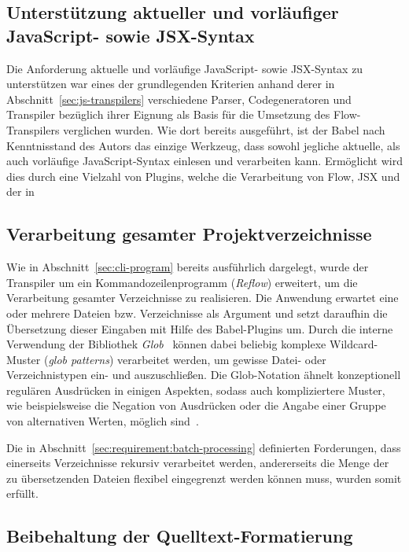 \subsection{Unterstützung aktueller und vorläufiger JavaScript- sowie JSX-Syntax}

Die Anforderung aktuelle und vorläufige JavaScript- sowie JSX-Syntax zu unterstützen war eines der grundlegenden Kriterien anhand derer in Abschnitt~\ref{sec:js-transpilers} verschiedene Parser, Codegeneratoren und Transpiler bezüglich ihrer Eignung als Basis für die Umsetzung des Flow-Transpilers verglichen wurden. Wie dort bereits ausgeführt, ist der Babel nach Kenntnisstand des Autors das einzige Werkzeug, dass sowohl jegliche aktuelle, als auch vorläufige JavaScript-Syntax einlesen und verarbeiten kann. Ermöglicht wird dies durch eine Vielzahl von Plugins, welche die Verarbeitung von Flow, JSX und der in


\subsection{Verarbeitung gesamter Projektverzeichnisse}

Wie in Abschnitt~\ref{sec:cli-program} bereits ausführlich dargelegt, wurde der Transpiler um ein Kommandozeilenprogramm (\textit{Reflow}) erweitert, um die Verarbeitung gesamter Verzeichnisse zu realisieren. Die Anwendung erwartet eine oder mehrere Dateien bzw. Verzeichnisse als Argument und setzt daraufhin die Übersetzung dieser Eingaben mit Hilfe des Babel-Plugins um.
Durch die interne Verwendung der Bibliothek \textit{Glob}~\autocite{NPM:GLOB} können dabei beliebig komplexe Wildcard-Muster (\textit{glob patterns}) verarbeitet werden, um gewisse Datei- oder Verzeichnistypen ein- und auszuschließen. Die Glob-Notation ähnelt konzeptionell regulären Ausdrücken in einigen Aspekten, sodass auch kompliziertere Muster, wie beispielsweise die Negation von Ausdrücken oder die Angabe einer Gruppe von alternativen Werten, möglich sind~\autocite{MAN:GLOB}.


Die in Abschnitt~\ref{sec:requirement:batch-processing} definierten Forderungen, dass einerseits Verzeichnisse rekursiv verarbeitet werden, andererseits die Menge der zu übersetzenden Dateien flexibel eingegrenzt werden können muss, wurden somit erfüllt.

\subsection{Beibehaltung der Quelltext-Formatierung}


